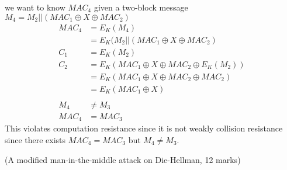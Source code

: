 \documentclass{assignment}
\begin{document}
\begin{problemlist}
\begin{problem}
\begin{answer}
\begin{enumerate}[label=(\alph*)]
\begin{enumerate}
                  we want to know $MAC_4$ given a two-block message\\
                  $M_4 = M_2||(MAC_1 \oplus X \oplus MAC_2)$
                  \begin{align*}
                  	MAC_4 &= E_K(M_4)\\
                    	  &= E_K(M_2 ||(MAC_1 \oplus X \oplus MAC_2) \\
                      C_1 &= E_K(M_2) \\
                      C_2 &= E_K(MAC_1 \oplus X \oplus MAC_2 \oplus E_K(M_2) ) \\
                          &= E_K(MAC_1 \oplus X \oplus MAC_2 \oplus MAC_2 ) \\
                          &= E_K(MAC_1 \oplus X) \\ \\
                      M_4 &\neq M_3 \\
                      MAC_4 &= MAC_3 
                  \end{align*}
                  This violates computation resistance since it is not weakly collision resistance since there exists $MAC_4 = MAC_3$ but $M_4 \neq M_3$.
		  \end{enumerate}
\end{enumerate}

\end{answer}
\end{problem}

\clearpage
\pbitem (A modified man-in-the-middle attack on Die-Hellman, 12 marks)
\begin{problem}
\begin{answer}


\end{answer}
\end{problem}
\end{problemlist}
\end{document}
